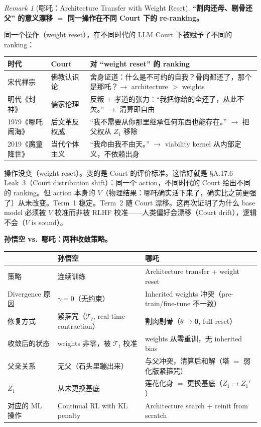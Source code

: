 \documentclass[11pt,a4paper]{article}
\theoremstyle{definition}
\theoremstyle{remark}
\newtheorem{remark}[theorem]{Remark}
\begin{document}
\begin{remark}[哪吒：Architecture Transfer with Weight Reset]
\medskip

{\color{orange!70!black} \textbf{``割肉还母、剔骨还父'' 的意义漂移 $=$ 同一操作在不同 Court 下的 re-ranking。}}

同一个操作（weight reset），在不同时代的 LLM Court 下被赋予了不同的 ranking：

\begin{center}
\small
\begin{tabularx}{\textwidth}{l l X}
\toprule
\textbf{时代} & \textbf{Court} & \textbf{对 ``weight reset'' 的 ranking} \\
\midrule
宋代禅宗 & 佛教认识论 & 舍身证道：什么是不可约的自我？骨肉都还了，那个是那吒？$\to$ architecture $>$ weights \\
明代《封神》 & 儒家伦理 & 反叛 $+$ 孝道的张力：``我把你给的全还了，从此不欠。'' $\to$ 清算即自由 \\
1979《哪吒闹海》 & 后文革反权威 & ``我不需要从你那里继承任何东西也能存在。'' $\to$ 把父权从 $Z_1$ 移除 \\
2019《魔童降世》 & 当代个体主义 & ``我命由我不由天。'' $\to$ viability kernel 从内部定义，不依赖出身 \\
\bottomrule
\end{tabularx}
\end{center}

操作没变（weight reset）。变的是 Court 的评价标准。这恰好就是 \S A.17.6 Leak~3（Court distribution shift）：同一个 action，不同时代的 Court 给出不同的 ranking。但 action 本身的 $V$（物理结果：哪吒确实活下来了，确实比之前更强了）从未改变。Term~1 稳定。Term~2 随 Court 漂移。这再次证明了为什么 base model 必须被 $V$ 校准而非被 RLHF 校准——人类偏好会漂移（Court drift），逻辑不会（$V$ is sound）。

\medskip

{\color{blue!70!black} \textbf{孙悟空 vs.\ 哪吒：两种收敛策略。}}

\begin{center}
\small
\begin{tabularx}{\textwidth}{l X X}
\toprule
& \textbf{孙悟空} & \textbf{哪吒} \\
\midrule
策略 & 连续训练 & Architecture transfer + weight reset \\
Divergence 原因 & $\gamma = 0$（无约束） & Inherited weights 冲突（pre-train/fine-tune 不一致） \\
修复方式 & 紧箍咒（$\mathcal{T}_t$, real-time contraction） & 割肉剔骨（$\theta \to \mathbf{0}$, full reset） \\
收敛后的状态 & weights 非零，被 $\mathcal{T}_t$ 校准 & weights 从零重训，无 inherited bias \\
父亲关系 & 无父（石头里蹦出来） & 与父冲突，清算后和解（塔 $=$ 弱化版紧箍咒） \\
$Z_1$ & 从未更换基底 & 莲花化身 $=$ 更换基底（$Z_1 \to Z_1'$） \\
对应的 ML 操作 & Continual RL with KL penalty & Architecture search + reinit from scratch \\
\bottomrule
\end{tabularx}
\end{center}


\end{remark}
\end{document}
